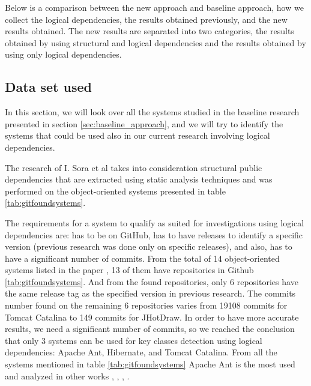 \documentclass[runningheads]{comsis2}
\begin{document}
Below is a comparison between the new approach and baseline approach, how we collect the logical dependencies, the results obtained previously, and the new results obtained. 
The new results are separated into two categories, the results obtained by using structural and logical dependencies and the results obtained by using only logical dependencies. 

\subsection{Data set used}
\label{sec:dataset}
In this section, we will look over all the systems studied in the baseline research presented in section \ref{sec:baseline_approach}, and we will try to identify the systems that could be used also in our current research involving logical dependencies.


The research of I. Sora et al \cite{Finding-key-classes} takes into consideration structural public dependencies that are extracted using static analysis techniques and was performed on the object-oriented systems presented in table \ref{tab:gitfoundsystems}.

The requirements for a system to qualify as suited for investigations using logical dependencies are: has to be on GitHub, has to have releases to identify a specific version (previous research was done only on specific releases), and also, has to have a significant number of commits. 
From the total of 14 object-oriented systems listed in the paper \cite{Finding-key-classes}, 13 of them have repositories in Github \ref{tab:gitfoundsystems}. And from the found repositories, only 6 repositories have the same release tag as the specified version in previous research.
The commits number found on the remaining 6 repositories varies from 19108 commits for Tomcat Catalina to 149 commits for JHotDraw. In order to have more accurate results, we need a significant number of commits, so we reached the conclusion that only 3 systems can be used for key classes detection using logical dependencies: Apache Ant, Hibernate, and Tomcat Catalina.  From all the systems mentioned in table \ref{tab:gitfoundsystems} Apache Ant is the most used and analyzed in other  works \cite{enase19}, \cite{7332515}, \cite{1402122}, \cite{Kamran2016IdentificationOC}.
\end{document}
